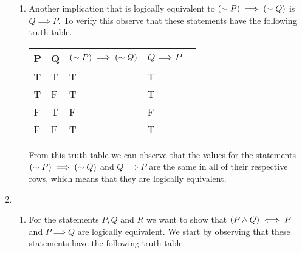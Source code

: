 \documentclass[12pt]{article}
\makeatletter
\newcommand*{\arabicodd}[1]{%
  \expandafter\@arabicodd\csname c@#1\endcsname
}
\newcommand*{\@arabicodd}[1]{%
  \@arabic{\numexpr(#1)*2-1\relax}%
}
\makeatother
\begin{document}
\begin{enumerate}[label=2.\arabicodd*, start=27]
\begin{enumerate}[label=(\alph*)]
          \item Another implication that is logically equivalent to $\qty(\sim P) \implies \qty(\sim Q)$
                is $Q \implies P.$ To verify this observe that these statements have the following truth table.
                \hfill
                \hfill
                \linebreak
                \linebreak
                \begin{minipage}{\linewidth}
                  \small
                  \begin{tabular}{@{}lllll@{}}
                    \toprule
                    P & Q & $\qty(\sim P) \implies \qty(\sim Q)$ & $Q \implies P$ \\ \midrule
                    T & T & T                                    & T              \\
                    T & F & T                                    & T              \\
                    F & T & F                                    & F              \\
                    F & F & T                                    & T              \\
                    \bottomrule
                  \end{tabular}
                \end{minipage}
                \linebreak
                \linebreak
                \linebreak
                \linebreak
                From this truth table we can observe that the values for the
                statements $\qty(\sim P) \implies \qty(\sim Q)$ and $Q \implies P$
                are the same in all of their respective rows, which means that
                they are logically equivalent.
        \end{enumerate}
  \item \begin{enumerate}[label=(\alph*)]
          \item
                For the statements $P, Q$ and $R$ we want to show that $\qty(P \land Q) \iff P$
                and $P \implies Q$ are logically equivalent.
                We start by observing that these statements have the following
                truth table.
                \hfill
                \hfill
                \linebreak

\end{enumerate}
\end{enumerate}
\end{document}
